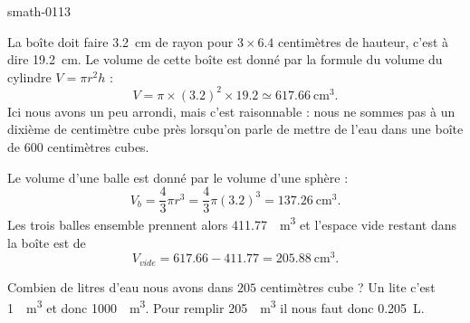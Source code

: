 
\begin{corrige}{smath-0113}

    La boîte doit faire \SI{3.2}{\centi\meter} de rayon pour \( 3\times 6.4\) centimètres de hauteur, c'est à dire \SI{19.2}{\centi\meter}. Le volume de cette boîte est donné par la formule du volume du cylindre \( V=\pi r^2h\) :
    \begin{equation}
        V=\pi\times(3.2)^2\times 19.2\simeq\SI{617.66}{\centi\cubic\meter}.
    \end{equation}
    Ici nous avons un peu arrondi, mais c'est raisonnable : nous ne sommes pas à un dixième de centimètre cube près lorsqu'on parle de mettre de l'eau dans une boîte de \( 600\) centimètres cubes.

    Le volume d'une balle est donné par le volume d'une sphère :
    \begin{equation}
        V_b=\frac{ 4 }{ 3 }\pi r^3=\frac{ 4 }{ 3 }\pi(3.2)^3=\SI{137.26}{\centi\cubic\meter}.
    \end{equation}
    Les trois balles ensemble prennent alors \SI{411.77}{\centi\cubic\meter} et l'espace vide restant dans la boîte est de
    \begin{equation}
        V_{vide}=617.66-411.77=\SI{205.88}{\centi\cubic\meter}.
    \end{equation}
    
    Combien de litres d'eau nous avons dans \( 205\) centimètres cube ? Un lite c'est \SI{1}{\deci\cubic\meter} et donc \SI{1000}{\centi\cubic\meter}. Pour remplir \SI{205}{\centi\cubic\meter} il nous faut donc \SI{0.205}{\liter}.


\end{corrige}
